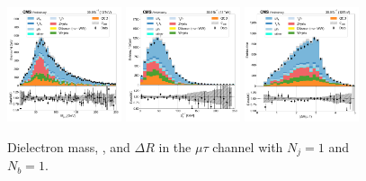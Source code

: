 \begin{figure}[htb!]
    \centering
    \includegraphics[width=0.3\textwidth]{chapters/Analysis/sectionPlots/figures/data_mc_overlays/mutau_2016_cat_eq1_eq1_signal_linear_lepton_dilepton1_mass}
    \includegraphics[width=0.3\textwidth]{chapters/Analysis/sectionPlots/figures/data_mc_overlays/mutau_2016_cat_eq1_eq1_signal_linear_lepton_dilepton1_pt}
    \includegraphics[width=0.3\textwidth]{chapters/Analysis/sectionPlots/figures/data_mc_overlays/mutau_2016_cat_eq1_eq1_signal_linear_lepton_dilepton1_delta_r}
    \caption{Dielectron mass, \pt, and $\Delta R$ in the $\mu\tau$ channel
    with $N_{j} = 1$ and $N_{b} = 1$.}
    \label{fig:analysis:plots:mutau_3_dilepton}
\end{figure}

